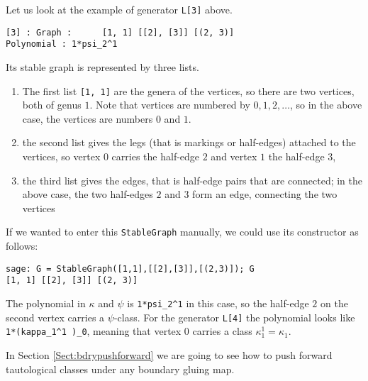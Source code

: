 \documentclass[11pt]{article}
\begin{document}
Let us look at the example of generator \verb|L[3]| above.
\begin{lstlisting}
[3] : Graph :      [1, 1] [[2], [3]] [(2, 3)]
Polynomial : 1*psi_2^1
\end{lstlisting}
Its stable graph is represented by three lists.
\begin{enumerate}
 \item The first list \verb|[1, 1]| are the genera of the vertices, so there are two vertices, both of genus $1$. Note that vertices are numbered by $0,1,2, \ldots$, so in the above case, the vertices are numbers $0$ and $1$.
 \item the second list gives the legs (that is markings or half-edges) attached to the vertices, so vertex $0$ carries the half-edge $2$ and vertex $1$ the half-edge $3$,
 \item the third list gives the edges, that is half-edge pairs that are connected; in the above case, the two half-edges $2$ and $3$ form an edge, connecting the two vertices
\end{enumerate}
If we wanted to enter this \verb|StableGraph| manually, we could use its constructor as follows:
\begin{lstlisting}
sage: G = StableGraph([1,1],[[2],[3]],[(2,3)]); G
[1, 1] [[2], [3]] [(2, 3)]
\end{lstlisting}

The polynomial in $\kappa$ and $\psi$ is \verb|1*psi_2^1| in this case, so the half-edge $2$ on the second vertex carries a $\psi$-class. For the generator \verb|L[4]| the polynomial looks like \verb|1*(kappa_1^1 )_0|, meaning that vertex $0$ carries a class $\kappa_1^1=\kappa_1$.

In Section \ref{Sect:bdrypushforward} we are going to see how to push forward tautological classes under any boundary gluing map.
\end{document}
